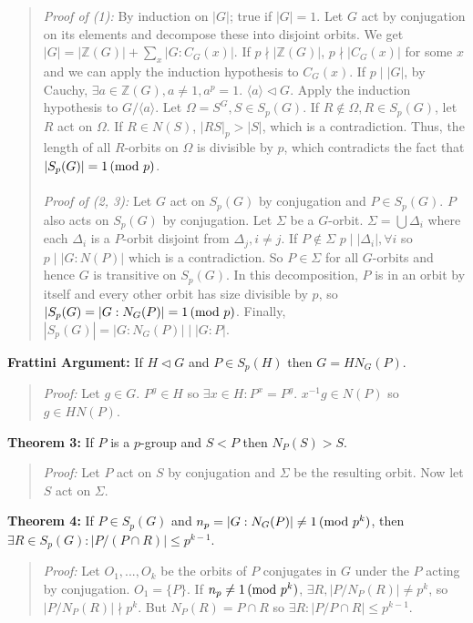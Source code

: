 \begin{quote}
\emph{Proof of (1):}  By induction on $|G|$; true if $|G|=1$.
Let $G$ act by conjugation on its elements and decompose these into disjoint orbits.  We get
$|G|= |{\mathbb Z}(G)|+\sum_{x} |G:C_G(x)|$.  If $p \nmid |{\mathbb Z}(G)|$, $p \nmid |C_G(x)|$
for some $x$ and we can apply the induction hypothesis to $C_G(x)$.  If $p \mid |G|$, by Cauchy,
$\exists a \in {\mathbb Z}(G), a \ne 1, a^p =1$.  $\langle a \rangle \lhd G$.  
Apply the induction hypothesis to $G/ \langle a \rangle$.  Let $\Omega = S^G, S \in S_p(G)$.
If $R \notin \Omega, R \in S_p(G)$, let $R$ act on $\Omega$. If $R \in N(S)$, $|RS|_p > |S|$,
which is a contradiction. Thus, the length of all $R$-orbits on $\Omega$ is divisible by $p$,
which contradicts the fact that $|S_p(G)| = 1 \thinspace \textnormal{(mod } p \textnormal{)}$.
\\
\\
\emph{Proof of (2, 3):}
Let $G$ act on $S_p(G)$ by conjugation and $P \in S_p(G)$.  $P$ also acts on $S_p(G)$ by
conjugation.  Let $\Sigma$ be a $G$-orbit.  $\Sigma= \bigcup \Delta_i$ where each
$\Delta_i$ is a $P$-orbit disjoint from $\Delta_j, i \ne j$.  If $P \notin \Sigma$
$p \mid |\Delta_i|, \forall i$ so $p \mid |G:N(P)|$ which is a contradiction.  So $P \in \Sigma$ for
all $G$-orbits and hence $G$ is transitive on $S_p(G)$.  In this decomposition, $P$ is in an orbit
by itself and every other orbit has size divisible by $p$, so $|S_p(G)= |G:N_G(P)| = 1 \thinspace \textnormal{(mod } p \textnormal{)}$.
Finally,
$|S_p(G)| = |G:N_G(P)| \mid |G:P|$.
\end{quote}
{\bf Frattini Argument:} If $H \lhd G$ and $P \in S_p(H)$ then $G= H N_G(P)$.
\begin{quote}
\emph{Proof:}  Let $g \in G$.  $P^g \in H$ so $\exists x \in H: P^x=P^g$.  $x^{-1}g \in N(P)$ so
$g \in HN(P)$.
\end{quote}
{\bf Theorem 3:} If $P$ is a $p$-group and $S < P$ then $N_P(S) > S$.
\begin{quote}
\emph{Proof:}  Let $P$ act on $S$ by conjugation and $\Sigma$ be the resulting orbit.
Now let $S$ act on $\Sigma$.
\end{quote}
{\bf Theorem 4:} If $P \in S_p(G)$ and $n_p=|G:N_G(P)| \ne 1 \thinspace \textnormal{(mod } p^k \textnormal{)}$, then $\exists R \in S_p(G) : |P/(P \cap R)| \leq p^{k-1}$.
\begin{quote}
\emph{Proof:} 
Let $O_1, ..., O_k$ be the orbits of $P$ conjugates in $G$ under the $P$ acting by conjugation. $O_1= \{P\}$.
If  $n_p  \ne 1 \thinspace \textnormal{(mod } p^k \textnormal{)}$,  $\exists R, |P/N_P(R)|  \ne p^k$, so $|P/N_P(R)| \nmid  p^k$.  But $N_P(R) = P \cap R$ so
$\exists R: |P/P \cap R| \leq p^{k-1}$.
\end{quote}

